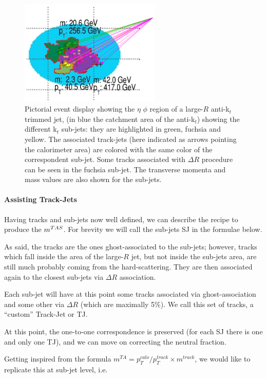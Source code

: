 \begin{figure}[!ht]
  \centering
      \includegraphics[width=0.6\textwidth]{jet_part/mtas/mtas.png}
  \caption[Pictorial event display]{Pictorial event display showing the $\eta$ $\phi$ region of a large-$R$ anti-k$_t$ trimmed jet, (in blue the catchment area of the anti-k$_t$) showing the different k$_t$ sub-jets: they are highlighted in green, fuchsia and yellow. The associated track-jets (here indicated as arrows pointing the calorimeter area) are colored with the same color of the correspondent sub-jet. Some tracks associated with $\Delta R$ procedure can be seen in the fuchsia sub-jet. The transverse momenta and mass values are also shown for the sub-jets.}
  \label{fig:mtas1}
\end{figure}

\paragraph{Assisting Track-Jets}
Having tracks and sub-jets now well defined, we can describe the recipe to produce the $m^{TAS}$. For brevity we will call the sub-jets SJ in the formulae below. 

As said, the tracks are the ones ghost-associated to the sub-jets; however, tracks which fall inside the area of the large-$R$ jet, but not inside the sub-jets area, are still much probably coming from the hard-scattering. They are then associated again to the closest sub-jets via $\Delta R$ association.

Each sub-jet will have at this point some tracks associated via ghost-association and some other via $\Delta R$ (which are maximally 5\%). We call this set of tracks, a ``custom'' Track-Jet or TJ.

At this point, the one-to-one correspondence is preserved (for each SJ there is one and only one TJ), and we can move on correcting the neutral fraction.

Getting inspired from the formula $m^{TA}=p_T^{calo}/p_T^{track}\times m^{track}$, we would like to replicate this at sub-jet level, i.e.

